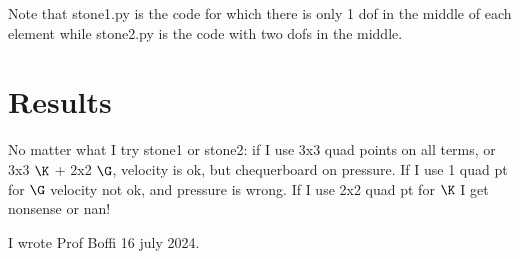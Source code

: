 Note that stone1.py is the code for which there is only 
1 dof in the middle of each element while stone2.py
is the code with two dofs in the middle.


\section*{Results}

No matter what I try stone1 or stone2: 
if I use 3x3 quad points on all terms, or 3x3 $\K$ + 2x2 $\G$, velocity is ok, but chequerboard on pressure.
If I use 1 quad pt for $\G$ velocity not ok, and pressure is wrong.
If I use 2x2 quad pt for $\K$ I get nonsense or nan!

I wrote Prof Boffi 16 july 2024.
